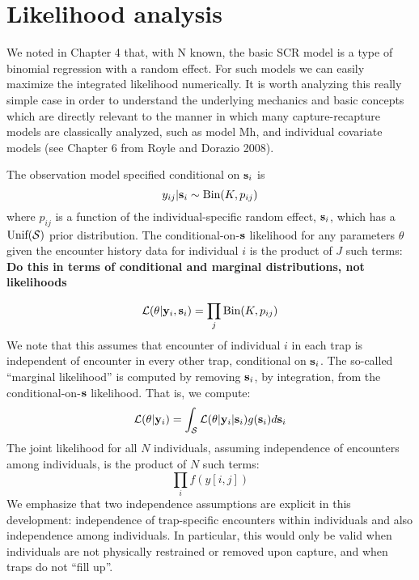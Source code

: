 \section{Likelihood analysis }

We noted in Chapter 4 that, with N known, the basic SCR model is a
type of binomial regression with a random effect. For such models we
can easily maximize the integrated likelihood numerically. It is worth
analyzing this really simple case in order to understand the
underlying mechanics and basic concepts which are directly relevant to
the manner in which many capture-recapture models are classically
analyzed, such as model Mh, and individual covariate models (see
Chapter 6 from Royle and Dorazio 2008).

The observation model specified conditional on ${\bf s}_{i}$ is 
\[
	y_{ij}| {\bf s}_{i} \sim \mbox{Bin}(K, p_{ij})
\]
where $p_{ij}$ is a function of the individual-specific random effect,
${\bf s}_{i}$, which has a $\mbox{Unif}({\cal S})$ prior distribution.  The
conditional-on-${\bf s}$ likelihood for any parameters $\theta$ given
the encounter history data for
individual $i$ is the product of $J$ such terms:
{\bf Do this in terms of conditional and marginal distributions, not likelihoods}

\[
     {\cal  L}( \theta | {\bold y}_{i} , {\bf s}_{i} ) =    \prod_{j} \mbox{Bin}(K, p_{ij})
\]
We note that this assumes that encounter of individual $i$ in each
trap is independent of encounter in every other trap, conditional on
${\bf s}_{i}$.  The so-called ``marginal likelihood'' is computed by removing
${\bf s}_{i}$, by integration, from the conditional-on-${\bf s}$ likelihood. That
is, we compute:
\[
         {\cal L}(\theta| {\bf y}_{i}) = 
\int_{{\cal S}} {\cal L}( \theta | {\bf y}_{i} |{\bf s}_{i}) g({\bf s}_{i}) d{\bf s}_{i}
\]
The joint likelihood for all $N$ individuals, assuming independence of
encounters among individuals, is the product of $N$ such terms:
\[
          \prod_{i}  f(y[i,j])
\]
We emphasize that two independence assumptions are explicit in this
development: independence of trap-specific encounters within
individuals and also independence among individuals. In particular,
this would only be valid when individuals are not physically
restrained or removed upon capture, and when traps do not “fill up”.

